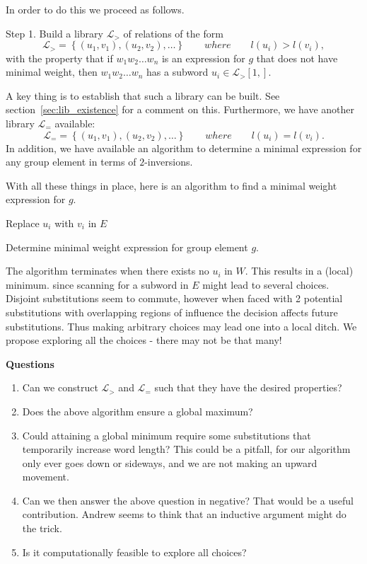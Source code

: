 \documentclass{article}
\begin{document}
In order to do this we proceed as follows.

Step 1. Build a library $\mathcal{L}_>$ of relations of the form 
\[ \mathcal{L}_> = \left\{ (u_1,v_1), (u_2,v_2), \ldots \right\} \qquad  where \qquad  l(u_i) > l(v_i),\]
with the property that if $w_1 w_2 \hdots w_n$ is an expression for $g$ that does not have minimal weight, then $w_1 w_2 \hdots w_n$ has a subword $u_i \in \mathcal{L}_>[1,]$. 

A key thing is to establish that such a library can be built. See section~\ref{sec:lib_existence} for a comment on this.
Furthermore, we have another library $\mathcal{L}_{=}$ available: 
\[ \mathcal{L}_{=} = \left\{ (u_1,v_1), (u_2,v_2), \ldots \right\} \qquad  where \qquad  l(u_i) = l(v_i).\]
In addition, we have available an algorithm to determine a minimal expression for any group element in terms of $2$-inversions.

With all these things in place, here is an algorithm to find a minimal weight expression for $g$.

\begin{algorithm}
 \SetAlgoLined
 {
   Replace $u_i$ with $v_i$ in $E$\;
 }
 \caption{Determine minimal weight expression for group element $g$.}\label{algo:minWeight1}
\end{algorithm}
The algorithm terminates when there exists no $u_i$ in $W$. This results in a (local) minimum.
since scanning for a subword in $E$ might lead to several choices. Disjoint substitutions seem to commute, however when faced with 2 potential substitutions with overlapping regions of influence the decision affects future substitutions. Thus making arbitrary choices may lead one into a local ditch. We propose exploring all the choices - there may not be that many!


\textbf{Questions}
\begin{enumerate}
\item Can we construct $\mathcal{L}_{>}$ and $\mathcal{L}_{=}$ such that they have the desired properties?
\item Does the above algorithm ensure a global maximum? 
\item Could attaining a global minimum require some substitutions that temporarily increase word length? This could be a pitfall, for our algorithm only ever goes down or sideways, and we are not making an upward movement.
\item Can we then answer the above question in negative? That would be a useful contribution. Andrew seems to think that an inductive argument might do the trick.
\item Is it computationally feasible to explore all choices?
\end{enumerate} 
 
\end{document}
